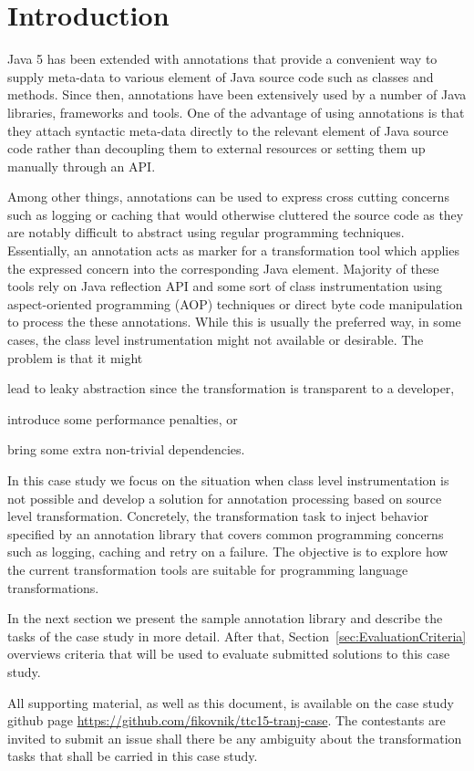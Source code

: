 
\section{Introduction}
\label{sec:Introduction}

Java 5 has been extended with annotations that provide a convenient way to supply meta-data to various element of Java source code such as classes and methods.
Since then, annotations have been extensively used by a number of Java libraries, frameworks and tools.
One of the advantage of using annotations is that they attach syntactic meta-data directly to the relevant element of Java source code rather than decoupling them to external resources or setting them up manually through an API.

Among other things, annotations can be used to express cross cutting concerns such as logging or caching that would otherwise cluttered the source code as they are notably difficult to abstract using regular programming techniques.
Essentially, an annotation acts as marker for a transformation tool which applies the expressed concern into the corresponding Java element.
Majority of these tools rely on Java reflection API and some sort of class instrumentation using aspect-oriented programming (AOP) techniques or direct byte code manipulation to process the these annotations.
While this is usually the preferred way, in some cases, the class level instrumentation might not available or desirable.
The problem is that it might 
%
\begin{inparaenum}[(i)]
\item lead to leaky abstraction since the transformation is transparent to a developer,
\item introduce some performance penalties, or
\item bring some extra non-trivial dependencies.
\end{inparaenum}

In this case study we focus on the situation when class level instrumentation is not possible and develop a solution for annotation processing based on source level transformation.
Concretely, the transformation task to inject behavior specified by an annotation library that covers common programming concerns such as logging, caching and retry on a failure.
The objective is to explore how the current transformation tools are suitable for programming language transformations.

In the next section we present the sample annotation library and describe the tasks of the case study in more detail.
After that, Section~\ref{sec:EvaluationCriteria} overviews criteria that will be used to evaluate submitted solutions to this case study.

All supporting material, as well as this document, is available on the case study github page \url{https://github.com/fikovnik/ttc15-tranj-case}.
The contestants are invited to submit an issue shall there be any ambiguity about the transformation tasks that shall be carried in this case study.

